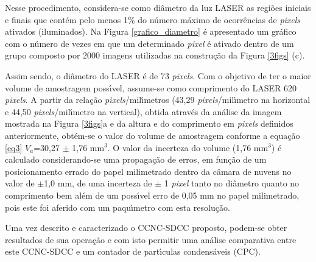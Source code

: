 Nesse procedimento, considera-se como di\^{a}metro da luz LASER as regi\~{o}es iniciais e finais que cont\'{e}m pelo menos 1\% do n\'{u}mero m\'{a}ximo de ocorr\^{e}ncias de \textit{pixels} ativados (iluminados). Na Figura \ref{grafico_diametro} \'{e} apresentado um gr\'{a}fico com o n\'{u}mero de vezes em que um determinado \textit{pixel} \'{e} ativado dentro de um grupo composto por 2000 imagens utilizadas na constru\c{c}\~{a}o da Figura \ref{3figs} (c).

Assim sendo, o di\^{a}metro do LASER \'{e} de 73 \textit{pixels}. Com o objetivo de ter o maior volume de amostragem poss\'{\i}vel, assume-se como comprimento do LASER 620 \textit{pixels}. A partir da rela\c{c}\~{a}o \emph{pixels}/mil\'{\i}metros (43,29 \emph{pixels}/mil\'{\i}metro na horizontal e 44,50 \emph{pixels}/mil\'{\i}metro na vertical), obtida atrav\'{e}s da an\'{a}lise da imagem mostrada na Figura \ref{3figs}a e da altura e do comprimento em \emph{pixels} definidos anteriormente, obt\'{e}m-se o valor do volume de amostragem conforme a equa\c{c}\~{a}o \ref{eq3} $V_a$=30,27 $\pm$ 1,76 mm$^3$. O valor da incerteza do volume (1,76 mm$^3$) \'{e} calculado considerando-se uma propaga\c{c}\~{a}o de erros, em fun\c{c}\~{a}o de um posicionamento errado do papel milimetrado dentro da c\^{a}mara de nuvens no valor de $\pm$1,0 mm,  de uma incerteza de  $\pm$ 1 \emph{pixel} tanto no di\^{a}metro quanto no comprimento bem al\'{e}m de um poss\'{\i}vel erro de 0,05 mm no papel milimetrado, pois este foi aferido com um paqu\'{\i}metro com esta resolu\c{c}\~{a}o.


Uma vez descrito e caracterizado o CCNC-SDCC proposto, podem-se obter resultados de sua opera\c{c}\~{a}o e com isto permitir uma an\'{a}lise comparativa entre este CCNC-SDCC e um contador de part\'{\i}culas condens\'{a}veis (CPC).





